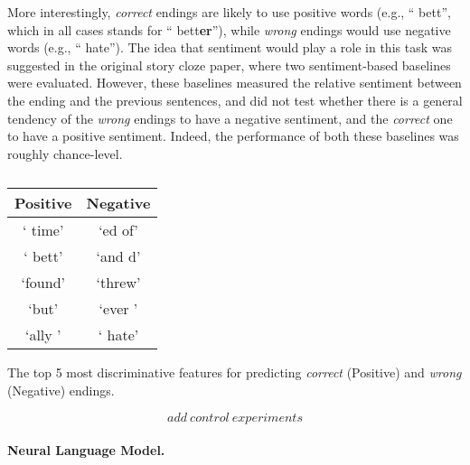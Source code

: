 \documentclass[11pt,a4paper]{article}
\newcommand{\ms}[1]{{\color{cyan}\{\textit{#1}\}$_{ms}$}}
\newcommand{\roy}[1]{\footnote{\color{red}{\textbf{Roy: #1}}}}
\begin{document}
More interestingly, {\it correct} endings are likely to use positive words (e.g., `` bett'', which in all cases stands for `` bett{\bf er}''), while  {\it wrong} endings would use negative words (e.g., `` hate''). 
The idea that  sentiment would play a role in this task was suggested in the original story cloze paper, where two sentiment-based baselines were evaluated. 
However, these baselines measured the relative sentiment between the ending and the previous sentences, and did not test whether there is a general tendency of the {\it wrong} endings to have a negative sentiment, and the {\it correct} one to have a positive sentiment.
Indeed, the performance of both these baselines was roughly chance-level.


\begin{table}[!t]
\begin{center}
\begin{tabular}{|c|c|} \hline
{\bf Positive} & {\bf Negative}\\ \hline
` time' & `ed of'\\ \hline
` bett' & `and d'\\ \hline
`found' & `threw'\\ \hline
`but' & `ever '\\ \hline
`ally ' & ` hate'\\ \hline

\end{tabular}
\end{center}
\caption{\label{features}}
The top 5 most discriminative features for predicting {\it correct} (Positive)  and {\it wrong} (Negative) endings.\end{table}

\[add\ control\ experiments\]

\paragraph{Neural Language Model.}
\end{document}
